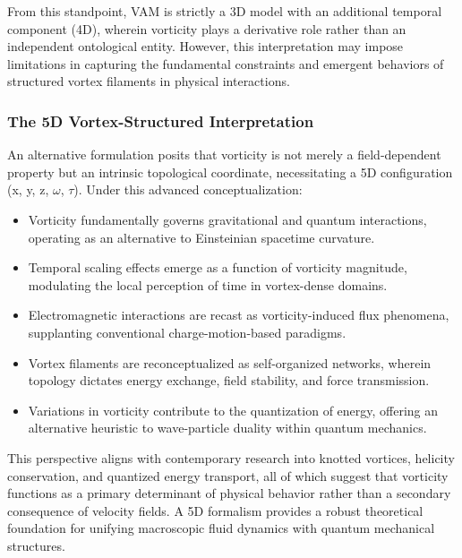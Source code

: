 From this standpoint, VAM is strictly a 3D model with an additional temporal component (4D), wherein vorticity plays a derivative role rather than an independent ontological entity.
However, this interpretation may impose limitations in capturing the fundamental constraints and emergent behaviors of structured vortex filaments in physical interactions.

\subsubsection*{The 5D Vortex-Structured Interpretation}
An alternative formulation posits that vorticity is not merely a field-dependent property but an intrinsic topological coordinate, necessitating a 5D configuration (x, y, z, $\omega$, $\tau$).
Under this advanced conceptualization:

\begin{itemize}
    \item Vorticity fundamentally governs gravitational and quantum interactions, operating as an alternative to Einsteinian spacetime curvature.
    \item Temporal scaling effects emerge as a function of vorticity magnitude, modulating the local perception of time in vortex-dense domains.
    \item Electromagnetic interactions are recast as vorticity-induced flux phenomena, supplanting conventional charge-motion-based paradigms.
    \item Vortex filaments are reconceptualized as self-organized networks, wherein topology dictates energy exchange, field stability, and force transmission.
    \item Variations in vorticity contribute to the quantization of energy, offering an alternative heuristic to wave-particle duality within quantum mechanics.
\end{itemize}
This perspective aligns with contemporary research into knotted vortices, helicity conservation, and quantized energy transport, all of which suggest that vorticity functions as a primary determinant of physical behavior rather than a secondary consequence of velocity fields.
A 5D formalism provides a robust theoretical foundation for unifying macroscopic fluid dynamics with quantum mechanical structures.

